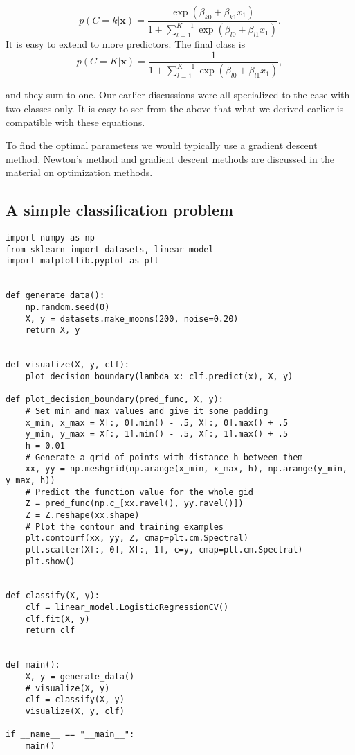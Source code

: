 \documentclass[%
oneside,                 %
final,                   %
10pt]{article}
\begin{document}
\[
p(C=k\vert \mathbf {x} )=\frac{\exp{(\beta_{k0}+\beta_{k1}x_1)}}{1+\sum_{l=1}^{K-1}\exp{(\beta_{l0}+\beta_{l1}x_1)}}.
\]
It is easy to extend to more predictors. The final class is 
\[
p(C=K\vert \mathbf {x} )=\frac{1}{1+\sum_{l=1}^{K-1}\exp{(\beta_{l0}+\beta_{l1}x_1)}},
\]

and they sum to one. Our earlier discussions were all specialized to
the case with two classes only. It is easy to see from the above that
what we derived earlier is compatible with these equations.

To find the optimal parameters we would typically use a gradient
descent method.  Newton's method and gradient descent methods are
discussed in the material on \href{{https://compphysics.github.io/MachineLearning/doc/pub/Splines/html/Splines-bs.html}}{optimization
methods}.




\subsection*{A simple classification problem}
\begin{verbatim}
import numpy as np
from sklearn import datasets, linear_model
import matplotlib.pyplot as plt


def generate_data():
    np.random.seed(0)
    X, y = datasets.make_moons(200, noise=0.20)
    return X, y


def visualize(X, y, clf):
    plot_decision_boundary(lambda x: clf.predict(x), X, y)

def plot_decision_boundary(pred_func, X, y):
    # Set min and max values and give it some padding
    x_min, x_max = X[:, 0].min() - .5, X[:, 0].max() + .5
    y_min, y_max = X[:, 1].min() - .5, X[:, 1].max() + .5
    h = 0.01
    # Generate a grid of points with distance h between them
    xx, yy = np.meshgrid(np.arange(x_min, x_max, h), np.arange(y_min, y_max, h))
    # Predict the function value for the whole gid
    Z = pred_func(np.c_[xx.ravel(), yy.ravel()])
    Z = Z.reshape(xx.shape)
    # Plot the contour and training examples
    plt.contourf(xx, yy, Z, cmap=plt.cm.Spectral)
    plt.scatter(X[:, 0], X[:, 1], c=y, cmap=plt.cm.Spectral)
    plt.show()


def classify(X, y):
    clf = linear_model.LogisticRegressionCV()
    clf.fit(X, y)
    return clf


def main():
    X, y = generate_data()
    # visualize(X, y)
    clf = classify(X, y)
    visualize(X, y, clf)

if __name__ == "__main__":
    main()
\end{verbatim}
\end{document}
